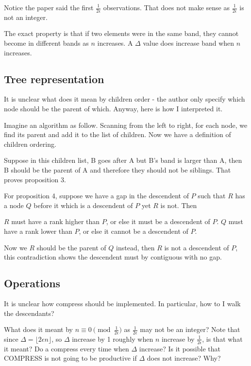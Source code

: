 \documentclass{article}
\begin{document}
Notice the paper said the first $ \frac{1}{2\epsilon} $ observations. That does not make sense as $ \frac{1}{2\epsilon} $ is not an integer.

The exact property is that if two elements were in the same band, they cannot become in different bands as $ n $ increases. A $ \Delta $ value does increase band when $ n $ increases.

\subsection*{Tree representation}
It is unclear what does it mean by children order - the author only specify which node should be the parent of which. Anyway, here is how I interpreted it.

Imagine an algorithm as follow. Scanning from the left to right, for each node, we find its parent and add it to the list of children. Now we have a definition of children ordering.

Suppose in this children list, B goes after A but B's band is larger than A, then B should be the parent of A and therefore they should not be siblings. That proves proposition 3.

For proposition 4, suppose we have a gap in the descendent of $ P $ such that $ R $ has a node $ Q $ before it which is a descendent of $ P $ yet $ R $ is not. Then 

$ R $ must have a rank higher than $ P $, or else it must be a descendent of $ P $.
$ Q $ must have a rank lower than $ P $, or else it cannot be a descendent of $ P $.

Now we $ R $ should be the parent of $ Q $ instead, then $ R $ is not a descendent of $ P $, this contradiction shows the descendent must by contiguous with no gap.

\subsection*{Operations}
It is unclear how compress should be implemented. In particular, how to I walk the descendants?

What does it meant by $ n \equiv 0 \pmod{\frac{1}{2\epsilon}} $ as $ \frac{1}{2\epsilon} $ may not be an integer? Note that since $ \Delta = \lfloor 2\epsilon n \rfloor $, so $ \Delta $ increase by 1 roughly when $ n $ increase by $ \frac{1}{2\epsilon} $, is that what it meant? Do a compress every time when $ \Delta $ increase? Is it possible that COMPRESS is not going to be productive if $ \Delta $ does not increase? Why?
\end{document}
